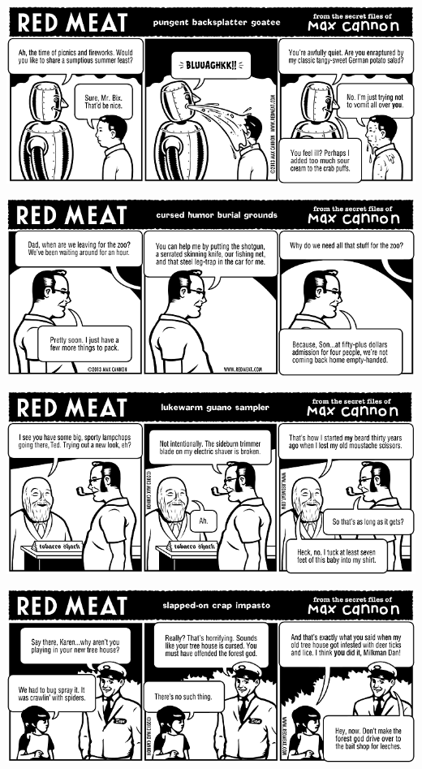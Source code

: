 \documentclass[a4paper,twoside,11pt]{article}
\begin{document}
\includegraphics[width=\textwidth]{redmeat_2013-06-25.png}



\includegraphics[width=\textwidth]{redmeat_2013-07-02.png}



\includegraphics[width=\textwidth]{redmeat_2013-07-09.png}



\includegraphics[width=\textwidth]{redmeat_2013-07-16.png}
\end{document}
